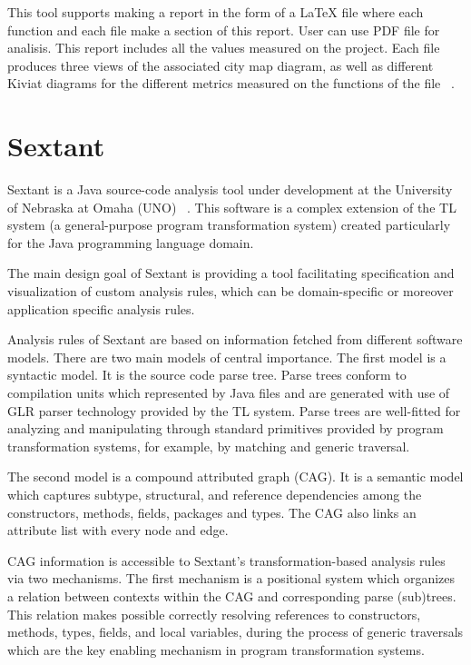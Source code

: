This tool supports making a report in the form of a LaTeX file where each function and each file make a section of this report. User can use PDF file for analisis. This report includes all the values measured on the project. Each file produces three views of the associated city map diagram, as well as different Kiviat diagrams for the different metrics measured on the functions of the file ~\cite{metrix}. 

\section{Sextant}

Sextant is a Java source-code analysis tool under development at the University of Nebraska at Omaha (UNO) ~\cite{sextant}. This software is a complex extension of the TL system (a general-purpose program transformation system) created particularly for the Java programming language domain.

The main design goal of Sextant is providing a tool facilitating specification and visualization of custom analysis rules, which can be domain-specific or moreover application specific analysis rules.

Analysis rules of Sextant are based on information fetched from different software models. There are two main models of central importance. The first model is a syntactic model. It is the source code parse tree. Parse trees conform to compilation units which represented by Java files and are generated with use of GLR parser technology provided by the TL system. Parse trees are well-fitted for analyzing and manipulating through standard primitives provided by program transformation systems, for example, by matching and generic traversal.

The second model is a compound attributed graph (CAG). It is a semantic model which captures subtype, structural, and reference dependencies among the constructors, methods, fields, packages and types. The CAG also links an attribute list with every node and edge.

CAG information is accessible to Sextant’s transformation-based analysis rules via two mechanisms. The first mechanism is a positional system which organizes a relation between contexts within the CAG and corresponding parse (sub)trees. This relation makes possible correctly resolving references to constructors, methods, types, fields, and local variables, during the process of generic traversals which are the key enabling mechanism in program transformation systems.

